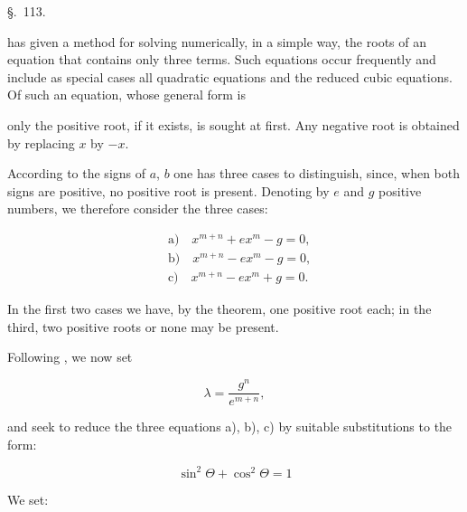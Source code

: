 
\begin{center}
\S.\ 113.


\end{center}

 has given a method for solving numerically, in a simple way, the roots of an equation that contains only three terms. Such equations occur frequently and include as special cases all quadratic equations and the reduced cubic equations. Of such an equation, whose general form is


only the positive root, if it exists, is sought at first. Any negative root is obtained by replacing $x$ by $-x$.

According to the signs of $a$, $b$ one has three cases to distinguish, since, when both signs are positive, no positive root is present. Denoting by $e$ and $g$ positive numbers, we therefore consider the three cases:

\[
\begin{aligned}
&\text{a)}\quad x^{m+n} + e x^m - g = 0,\\
&\text{b)}\quad x^{m+n} - e x^m - g = 0,\\
&\text{c)}\quad x^{m+n} - e x^m + g = 0.
\end{aligned}
\]

In the first two cases we have, by the  theorem, one positive root each; in the third, two positive roots or none may be present.

Following , we now set

\[
\lambda = \frac{g^n}{e^{m+n}},
\]

and seek to reduce the three equations a), b), c) by suitable substitutions to the form:

\[
\sin^2\Theta + \cos^2\Theta = 1
\]

We set:

